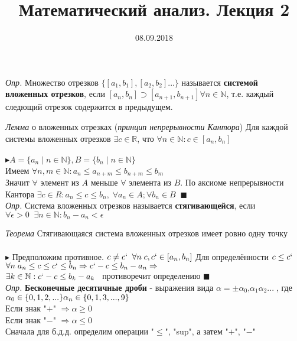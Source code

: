 \documentclass[a4paper, 12pt]{article}
\begin{document}
    \title{Математический анализ. Лекция 2}
    \date{08.09.2018}
    \maketitle

    \textit{Опр.} Множество отрезков $ \{[a_{1}, b_{1}], [a_{2}, b_{2}] ... \} $ называется \textbf{системой вложенных отрезков}, если $ [a_{n}, b_{n}] \supset [a_{n + 1}, b_{n + 1}] \forall n \in \mathbb{N}$, т.е. каждый следющий отрезок содержится в предыдущем.

    \textit{Лемма} о вложенных отрезках (\textit{принцип непрерывности Кантора}) Для каждой системы вложенных отрезков $ \exists c \in \mathbb{R} $, что $ \forall n \in \mathbb{N} : c \in [a_{n}, b_{n}] $\\
    \\
    $ \blacktriangleright A = \{a_{n} \;|\; n \in \mathbb{N}\}, B = \{b_{n} \;|\; n \in \mathbb{N}\}$\\
    Имеем $ \forall n, m \in \mathbb{N} : a_{n} \le a_{n + m} \le b_{n + m} \le b_{m}$\\
    Значит $\forall$ элемент из $A$ меньше $\forall$ элемента из $B$. По аксиоме непрерывности Кантора $ \exists c \in R : a_{n} \le c \le b_{n}, \; \forall a_{n} \in A; \forall b_{n} \in B \;\; \blacksquare $ \\

    \textit{Опр.} Система вложенных отрезков называется \textbf{стягивающейся}, если \\ $ \forall \epsilon > 0 \;\; \exists n \in \mathbb{N} : b_{n} - a_{n} < \epsilon $

    \textit{Теорема} Стягивающаяся система вложенных отрезков имеет ровно одну точку \\
    \\
    $ \blacktriangleright $ Предположим противное. $ c \ne c` \;\; \forall n \; c, c` \in [a_{n}, b_{n}] $ Для определённости $ c \le c` $ \\
    $ \forall n \; a_{n} \le c \le c` \le b_{n} \Rightarrow c` - c \le b_{n} - a_{n}  \Rightarrow $ \\
    $ \exists k \in \mathbb{N} : c` - c \le b_{k} - a_{k} \;\;$ противоречит определению $\blacksquare$\\

    \textit{Опр.} \textbf{Бесконечные десятичные дроби} - выражения вида $ \alpha = \pm \alpha_{0}\textbf{,}\alpha_{1}\alpha_{2}... \;$, где \\ $\alpha_{0} \in \{0, 1, 2, ...\} \\ \alpha_{n} \in \{0, 1, 3, ... , 9\} $\\
    Если знак "$+$" $\Rightarrow \alpha \ge 0 $ \\
    Если знак "$-$" $\Rightarrow \alpha \le 0 $ \\
    Сначала для б.д.д. определим операции "$\le$", "sup"{}, а затем "$+$"{}, "$-$"
    \\
\end{document}
